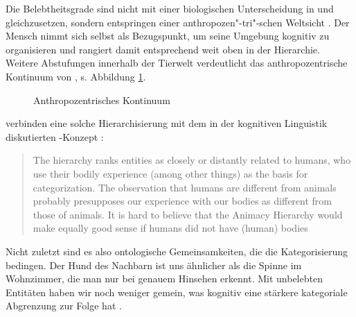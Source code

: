Die Belebtheitsgrade sind nicht mit einer biologischen Unterscheidung in  und  gleichzusetzen, sondern entspringen einer anthropozen"-tri"-schen Weltsicht \parencite[s.][]{Fraurud1996,Yamamoto1999,Enger2011}. Der Mensch nimmt sich selbst als Bezugspunkt, um seine Umgebung kognitiv zu organisieren und rangiert damit entsprechend weit oben in der Hierarchie. Weitere Abstufungen innerhalb der Tierwelt verdeutlicht das anthropozentrische Kontinuum von \textcite[114--115]{Kopcke2000}, s. Abbildung \ref{anthro}. 

\begin{figure}
{\small{}}
\caption {Anthropozentrisches Kontinuum \parencite[115]{Kopcke2000}}
\label{anthro}
\end{figure} 

 \noindent
\textcite{Enger2011} verbinden eine solche Hierarchisierung mit dem in der kognitiven Linguistik diskutierten -Konzept \parencite[vgl.][]{Lakoff1999}:
\blockcquote[208]{Enger2011}[.]{The hierarchy ranks entities as
closely or distantly related to humans, who use their bodily experience (among other things) as the basis for categorization. The observation that humans are different from animals probably presupposes our experience with our bodies as different from those of animals. It is hard to believe that the Animacy Hierarchy would make equally good sense if humans did not have (human) bodies} Nicht zuletzt sind es also ontologische Gemeinsamkeiten, die die Kategorisierung bedingen. Der Hund des Nachbarn ist uns ähnlicher als die Spinne im Wohnzimmer, die man nur bei genauem Hinsehen erkennt.
Mit unbelebten Entitäten haben wir noch weniger gemein, was kognitiv eine stärkere kategoriale Abgrenzung zur Folge hat  \parencite[vgl. auch][16]{Yamamoto1999}.

